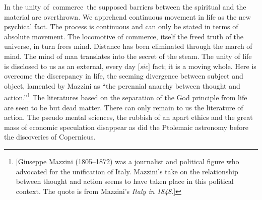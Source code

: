 \documentclass[twoside,symmetric,nobib,justified]{tufte-book}
\begin{document}
In the unity of~commerce~the supposed barriers between the spiritual and
the material are overthrown. We apprehend continuous movement in life as
the new psychical fact. The process is continuous and can only be stated
in terms of absolute movement. The locomotive of commerce, itself the
freed truth of the universe, in turn frees mind. Distance has been
eliminated through the march of mind. The mind of man translates into
the secret of the steam. The unity of life is disclosed to us as an
external, every day {[}\emph{sic}{]} fact; it is a moving whole. Here is
overcome the discrepancy in life, the seeming divergence between subject
and object, lamented by Mazzini as ``the perennial anarchy between
thought and action.''\footnote{{[}Giuseppe Mazzini (1805--1872) was a
  journalist and political figure who advocated for the unification of
  Italy. Mazzini's take on the relationship between thought and action
  seems to have taken place in this political context. The quote is from
  Mazzini's \emph{Italy in 1848}.{]}

  \hfill\break
} The literatures based on the separation of the God principle from life
are seen to be but dead matter. There can only remain to us the
literature of action. The pseudo mental sciences, the rubbish of an
apart ethics and the great mass of economic speculation disappear as did
the Ptolemaic astronomy before the discoveries of Copernicus.~~
\end{document}
